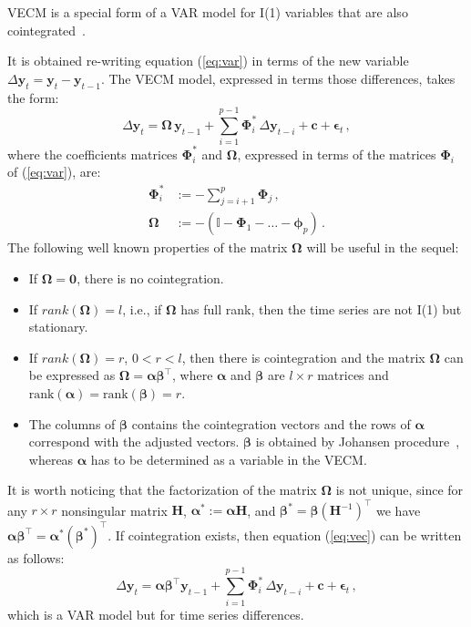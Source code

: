 VECM is a special form of a VAR model for I(1) variables that are also
cointegrated~\cite{banerjee1993}.

It is obtained re-writing equation (\ref{eq:var}) in terms of the new
variable $\Delta\mathbf{y}_t=\mathbf{y}_t-\mathbf{y}_{t-1}$.
The VECM model, expressed in terms those differences, takes the form:
\begin{equation}\label{eq:vec}
\Delta \mathbf{y}_t 
= \boldsymbol{\Omega}\,\mathbf{y}_{t-1}
  + \sum_{i=1}^{p-1} \boldsymbol{\Phi}_i^*\,\Delta\mathbf{y}_{t-i}
  + \mathbf{c} + \boldsymbol{\epsilon}_t\,,
\end{equation}
\noindent
where the coefficients matrices $\boldsymbol{\Phi}_i^*$ and 
$\boldsymbol{\Omega}$, expressed in terms of the matrices
$\boldsymbol{\Phi}_i$ of (\ref{eq:var}), are:
\begin{align*}
\boldsymbol{\Phi}_i^* 
&:= -\sum_{j=i+1}^{p}\boldsymbol{\Phi}_j\,, \\
\boldsymbol{\Omega}
&:= -\left( \mathbb{I} - \boldsymbol{\Phi}_1 - \dots 
    - \boldsymbol{\phi}_p \right)\,. 
\end{align*}
The following well known properties of the matrix $\boldsymbol{\Omega}$
\cite{johansen1995} will be useful in the sequel:
\begin{itemize}
\item
If $\boldsymbol{\Omega} = \mathbf{0}$, there is no cointegration.
\item 
If $rank(\boldsymbol{\Omega})=l$, i.e., if $\boldsymbol{\Omega}$ has
full rank, then the time series are not I(1) but stationary.
\item
If $rank(\boldsymbol{\Omega})=r$, $0<r<l$, then there is cointegration
and the matrix $\boldsymbol{\Omega}$ can be expressed as
$\boldsymbol{\Omega}=\boldsymbol{\alpha\beta}^\top$, where $\boldsymbol{\alpha}$
and $\boldsymbol{\beta}$ are
$l\times r$ matrices and
$\text{rank}(\boldsymbol{\alpha})=\text{rank}(\boldsymbol{\beta})=r$.
\item
The columns of $\boldsymbol{\beta}$ contains the cointegration vectors and the rows of
$\boldsymbol{\alpha}$ correspond with the adjusted vectors. 
$\boldsymbol{\beta}$ is obtained by Johansen procedure~\cite{johansen1988},
whereas $\boldsymbol{\alpha}$ has to be determined as a variable in the VECM.
\end{itemize}
It is worth noticing that the factorization of the matrix
$\boldsymbol\Omega$ is not unique, since for any $r \times r$
nonsingular matrix $\mathbf{H}$, $\boldsymbol{\alpha}^*:=\boldsymbol{\alpha}\mathbf{H}$,
and $\boldsymbol{\beta}^*=\boldsymbol{\beta}(\mathbf{H}^{-1})^\top$ we have
$\boldsymbol{\alpha\beta}^\top=\boldsymbol{\alpha}^*(\boldsymbol{\beta}^*)^\top$.
If cointegration exists, then equation (\ref{eq:vec}) can be written
as follows:
\begin{equation}\label{eq:vecfull}
\Delta\mathbf{y}_t 
= \boldsymbol{\alpha\beta}^\top\mathbf{y}_{t-1} 
  + \sum_{i=1}^{p-1}\boldsymbol{\Phi}_i^*\,\Delta\mathbf{y}_{t-i}
  + \mathbf{c} + \boldsymbol{\epsilon}_t\,,
\end{equation}
\noindent
which is a VAR model but for time series differences.


